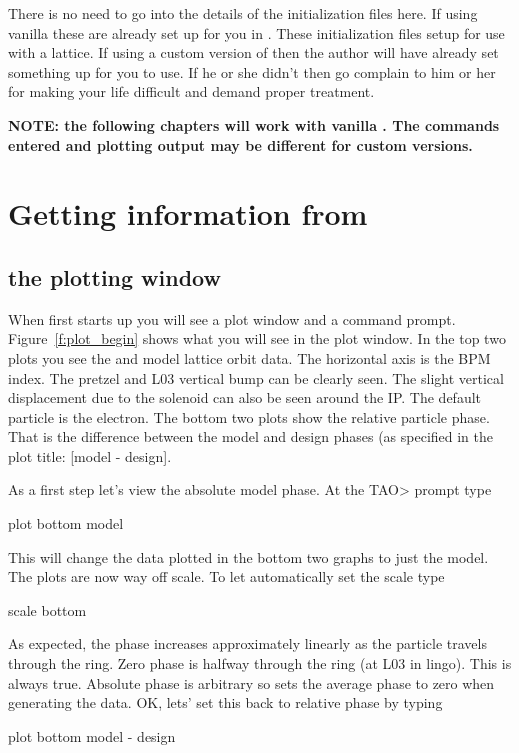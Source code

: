 \documentclass{book}
\begin{document}
There is no need to go into the details of the initialization files here. If
using vanilla \tao these are already set up for you in . These
initialization files setup \tao for use with a \cesr lattice. If
using a custom version of \tao then the author will have already set something
up for you to use. If he or she didn't then go complain to him or her for making
your life difficult and demand proper treatment.

\textbf{NOTE: the following chapters will work with vanilla \tao. The commands
entered and plotting output may be different for custom versions.}


\chapter{Getting information from \tao}
\label{c:get_info}

\section{the plotting window}

When \tao first starts up you will see a plot window and a command prompt. 
Figure~\ref{f:plot_begin} shows what you will see in the plot window. In the top
two plots you see the  and  model lattice orbit data. The horizontal
axis is the \cesr BPM index. The pretzel and L03 vertical bump can be clearly 
seen. The slight vertical displacement due to the solenoid can also be seen around 
the IP. The default particle is the electron. The bottom two plots show the relative 
particle phase. That is the difference
between the model and design phases (as specified in the plot title: [model -
design]. 

As a first step let's view the absolute model phase. At the TAO> prompt type
\begin{example}
  plot bottom model
\end{example}
This will change the data plotted in the bottom two graphs to just the model.
The plots are now way off scale. To let \tao automatically set the scale type
\begin{example}
  scale bottom
\end{example}
As expected, the phase increases approximately linearly as the particle travels
through the ring. Zero phase is halfway through the ring (at L03 in \cesr lingo).
This is always true. Absolute phase is arbitrary so \tao sets the average
phase to zero when generating the data. OK, lets' set this back to relative
phase by typing
\begin{example}
  plot bottom model - design
\end{example}
\end{document}
